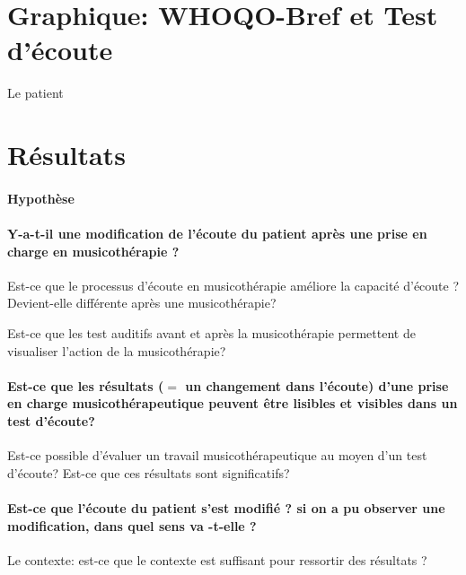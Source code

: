  





      



 


\section{Graphique:  WHOQO-Bref et Test d'écoute}

Le patient 


\section{Résultats}










   
 

  

  
  


   
   
   
   







\paragraph{Hypothèse}



\paragraph{Y-a-t-il une modification de l'écoute du patient après une prise
en charge en musicothérapie ?}
Est-ce que le processus d'écoute en musicothérapie améliore la capacité
d'écoute ? Devient-elle différente après une musicothérapie?

Est-ce que les test auditifs avant et après la musicothérapie permettent
de visualiser l'action de la musicothérapie?


\paragraph{Est-ce que les résultats ($=$ un changement dans l'écoute) d'une prise
en charge musicothérapeutique peuvent être lisibles et visibles dans
un test d'écoute?}
Est-ce possible d'évaluer un travail musicothérapeutique au moyen
d'un test d'écoute?
Est-ce que ces résultats sont significatifs? 

\paragraph{Est-ce que l'écoute du patient s'est modifié ? si on a pu observer
une modification, dans quel sens va -t-elle ?}

Le contexte: 
est-ce que le contexte est suffisant pour
ressortir des résultats ?





